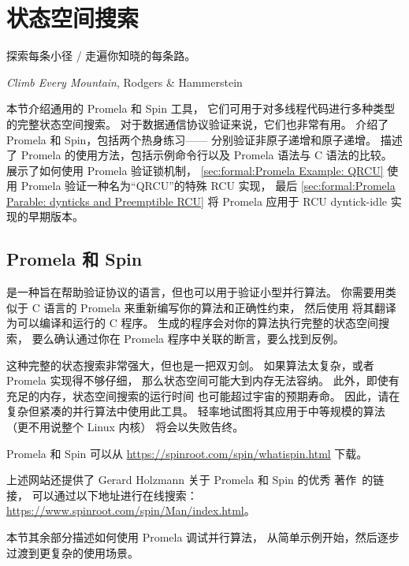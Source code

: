 
\section{状态空间搜索}
\label{sec:formal:State-Space Search}
%
\epigraph{探索每条小径 / 走遍你知晓的每条路。}
	 {\emph{Climb Every Mountain}, Rodgers \& Hammerstein}

本节介绍通用的 Promela 和 Spin 工具，
它们可用于对多线程代码进行多种类型的完整状态空间搜索。
对于数据通信协议验证来说，它们也非常有用。
介绍了 Promela 和 Spin，包括两个热身练习——
分别验证非原子递增和原子递增。
描述了 Promela 的使用方法，包括示例命令行以及
Promela 语法与 C 语法的比较。
展示了如何使用 Promela 验证锁机制，
\cref{sec:formal:Promela Example: QRCU}
使用 Promela 验证一种名为``QRCU''的特殊 RCU 实现，
最后
\cref{sec:formal:Promela Parable: dynticks and Preemptible RCU}
将 Promela 应用于 RCU dyntick-idle 实现的早期版本。

\subsection{Promela 和 Spin}
\label{sec:formal:Promela and Spin}

 是一种旨在帮助验证协议的语言，但也可以用于验证小型并行算法。
你需要用类似于 C 语言的 Promela 来重新编写你的算法和正确性约束，
然后使用  将其翻译为可以编译和运行的 C 程序。
生成的程序会对你的算法执行完整的状态空间搜索，
要么确认通过你在 Promela 程序中关联的断言，要么找到反例。

这种完整的状态搜索非常强大，但也是一把双刃剑。
如果算法太复杂，或者 Promela 实现得不够仔细，
那么状态空间可能大到内存无法容纳。
此外，即使有充足的内存，状态空间搜索的运行时间
也可能超过宇宙的预期寿命。
因此，请在复杂但紧凑的并行算法中使用此工具。
轻率地试图将其应用于中等规模的算法（更不用说整个 Linux 内核）
将会以失败告终。

Promela 和 Spin 可以从
\url{https://spinroot.com/spin/whatispin.html} 下载。

上述网站还提供了 Gerard Holzmann 关于 Promela 和 Spin 的优秀
著作~\cite{Holzmann03a}的链接，
可以通过以下地址进行在线搜索：
\url{https://www.spinroot.com/spin/Man/index.html}。

本节其余部分描述如何使用 Promela 调试并行算法，
从简单示例开始，然后逐步过渡到更复杂的使用场景。

